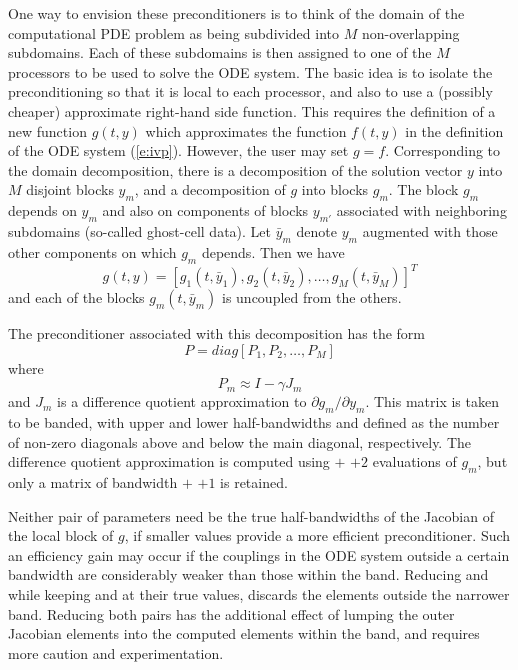 One way to envision these preconditioners is to think of the domain of
the computational PDE problem as being subdivided into $M$ non-overlapping
subdomains.  Each of these subdomains is then assigned to one of the
$M$ processors to be used to solve the ODE system. The basic idea is
to isolate the preconditioning so that it is local to each processor,
and also to use a (possibly cheaper) approximate right-hand side
function. This requires the definition of a new function $g(t,y)$
which approximates the function $f(t, y)$ in the definition of the ODE
system (\ref{e:ivp}). However, the user may set $g = f$.  Corresponding
to the domain decomposition, there is a decomposition of the solution
vector $y$ into $M$ disjoint blocks $y_m$, and a decomposition of $g$
into blocks $g_m$.  The block $g_m$ depends on $y_m$ and also on
components of blocks $y_{m'}$ associated with neighboring subdomains
(so-called ghost-cell data).  Let $\bar{y}_m$ denote $y_m$ augmented
with those other components on which $g_m$ depends.  Then we have
\begin{equation}
  g(t,y) = [g_1(t,\bar{y}_1), g_2(t,\bar{y}_2), \ldots, g_M(t,\bar{y}_M)]^T
\end{equation}
and each of the blocks $g_m(t, \bar{y}_m)$ is uncoupled from the others.

The preconditioner associated with this decomposition has the form 
\begin{equation}
  P= diag[P_1, P_2, \ldots, P_M]
\end{equation}
where 
\begin{equation}
  P_m \approx I - \gamma J_m
\end{equation}
and $J_m$ is a difference quotient approximation to 
$\partial g_m/\partial y_m$. This matrix is taken to be banded, with
upper and lower half-bandwidths  and  defined as
the number of non-zero diagonals above and below the main diagonal,
respectively. The difference quotient approximation is computed using
 $+$  $+ 2$ evaluations of $g_m$, but only a matrix
of bandwidth  $+$  $+ 1$ is retained.

Neither pair of parameters need be the true half-bandwidths of the Jacobian
of the local block of $g$, if smaller values provide a more efficient
preconditioner.  Such an efficiency gain may occur if the couplings
in the ODE system outside a certain bandwidth are considerably weaker than
those within the band.  Reducing  and  while keeping
 and  at their true values, discards the elements
outside the narrower band.  Reducing both pairs has the additional
effect of lumping the outer Jacobian elements into the computed elements
within the band, and requires more caution and experimentation.

